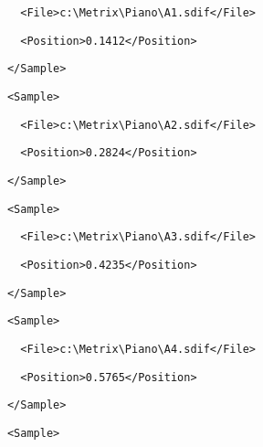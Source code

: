 \documentclass[a4paper,english,american]{book}
\begin{document}
{\begin{spacing}{0.8}
\texttt{\footnotesize ~~~~~~~~<File>c:\textbackslash{}Metrix\textbackslash{}Piano\textbackslash{}A1.sdif</File>}{\footnotesize\par
}
\par
\texttt{\footnotesize ~~~~~~~~<Position>0.1412</Position>}{\footnotesize\par
}
\par
\texttt{\footnotesize ~~~~~~</Sample>}{\footnotesize\par
}
\par
\texttt{\footnotesize ~~~~~~<Sample>}{\footnotesize\par
}
\par
\texttt{\footnotesize ~~~~~~~~<File>c:\textbackslash{}Metrix\textbackslash{}Piano\textbackslash{}A2.sdif</File>}{\footnotesize\par
}
\par
\texttt{\footnotesize ~~~~~~~~<Position>0.2824</Position>}{\footnotesize\par
}
\par
\texttt{\footnotesize ~~~~~~</Sample>}{\footnotesize\par
}
\par
\texttt{\footnotesize ~~~~~~<Sample>}{\footnotesize\par
}
\par
\texttt{\footnotesize ~~~~~~~~<File>c:\textbackslash{}Metrix\textbackslash{}Piano\textbackslash{}A3.sdif</File>}{\footnotesize\par
}
\par
\texttt{\footnotesize ~~~~~~~~<Position>0.4235</Position>}{\footnotesize\par
}
\par
\texttt{\footnotesize ~~~~~~</Sample>}{\footnotesize\par
}
\par
\texttt{\footnotesize ~~~~~~<Sample>}{\footnotesize\par
}
\par
\texttt{\footnotesize ~~~~~~~~<File>c:\textbackslash{}Metrix\textbackslash{}Piano\textbackslash{}A4.sdif</File>}{\footnotesize\par
}
\par
\texttt{\footnotesize ~~~~~~~~<Position>0.5765</Position>}{\footnotesize\par
}
\par
\texttt{\footnotesize ~~~~~~</Sample>}{\footnotesize\par
}
\par
\texttt{\footnotesize ~~~~~~<Sample>}{\footnotesize\par
}
\end{spacing}}
\end{document}

